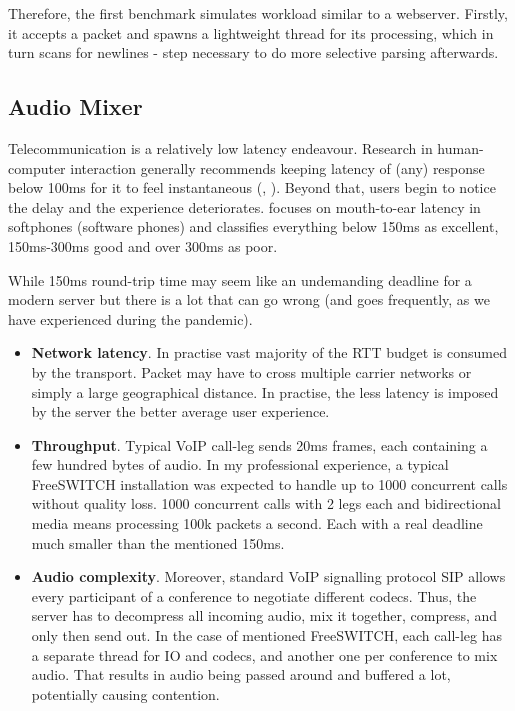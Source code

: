 \documentclass[12pt,a4paper,twoside]{report}
\begin{document}
Therefore, the first benchmark simulates workload similar to a webserver. Firstly, it accepts a packet and spawns a lightweight thread for its processing, which in turn scans for newlines - step necessary to do more selective parsing afterwards. 


\subsection{Audio Mixer}
\label{section:bench-audio-mixer}
Telecommunication is a relatively low latency endeavour. Research in human-computer interaction generally recommends keeping latency of (any) response below 100ms for it to feel instantaneous (\cite{Miller1968}, \cite{Amin2013}). Beyond that, users begin to notice the delay and the experience deteriorates. \cite{voip-latency} focuses on mouth-to-ear latency in softphones (software phones) and classifies everything below 150ms as excellent, 150ms-300ms good and over 300ms as poor. 

While 150ms round-trip time may seem like an undemanding deadline for a modern server but there is a lot that can go wrong (and goes frequently, as we have experienced during the pandemic). 
\begin{itemize}
    \item \textbf{Network latency}. In practise vast majority of the RTT budget is consumed by the transport. Packet may have to cross multiple carrier networks or simply a large geographical distance. In practise, the less latency is imposed by the server the better average user experience. 
    \item \textbf{Throughput}. Typical VoIP call-leg sends 20ms frames, each containing a few hundred bytes of audio. In my professional experience, a typical FreeSWITCH \cite{Maruzzelli2017-ou} installation was expected to handle up to 1000 concurrent calls without quality loss. 1000 concurrent calls with 2 legs each and bidirectional media means processing 100k packets a second. Each with a real deadline much smaller than the mentioned 150ms. 
    \item \textbf{Audio complexity}. Moreover, standard VoIP signalling protocol SIP allows every participant of a conference to negotiate different codecs. Thus, the server has to decompress all incoming audio, mix it together, compress, and only then send out. In the case of mentioned FreeSWITCH, each call-leg has a separate thread for IO and codecs, and another one per conference to mix audio. That results in audio being passed around and buffered a lot, potentially causing contention.   
\end{itemize}
\end{document}

